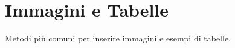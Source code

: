 \chapter{Immagini e Tabelle} 
\label{chapter:immagini_e_tabelle} 
Metodi più comuni per inserire immagini e esempi di tabelle. \cite{eco:tesi}






